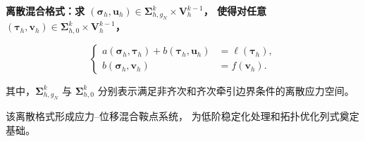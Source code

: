 \documentclass[notheorems]{beamer}
\begin{document}
\begin{frame}
{\begin{tcolorbox}
{					{\fontsize{7.6}{9.6}\selectfont\bfseries\sffamily
						离散混合格式：求
						$(\boldsymbol{\sigma}_h,\boldsymbol{u}_h)
						\in
						\boldsymbol{\Sigma}_{h,g_N}^{k}
						\times
						\boldsymbol{V}_h^{k-1}$，
						使得对任意
						$(\boldsymbol{\tau}_h,\boldsymbol{v}_h)
						\in
						\boldsymbol{\Sigma}_{h,0}^{k}
						\times
						\boldsymbol{V}_h^{k-1}$，}
					
					\vspace{-1.45em}
					
					\[
					\left\{
					\begin{aligned}
						a(\boldsymbol{\sigma}_h,\boldsymbol{\tau}_h)
						+
						b(\boldsymbol{\tau}_h,\boldsymbol{u}_h)
						&=
						\ell(\boldsymbol{\tau}_h),
						\\[4pt]
						b(\boldsymbol{\sigma}_h,\boldsymbol{v}_h)
						&=
						f(\boldsymbol{v}_h).
					\end{aligned}
					\right.
					\]
					
					{\fontsize{7.6}{9.6}\selectfont
						其中，$\boldsymbol{\Sigma}_{h,g_N}^{k}$ 与
						$\boldsymbol{\Sigma}_{h,0}^{k}$
						分别表示满足非齐次和齐次牵引边界条件的离散应力空间。}
				}
			\end{tcolorbox}
			
			\begin{tcolorbox}[
				colback=structure.fg, colframe=structure.fg,
				arc=3pt, boxrule=0pt,
				top=3pt, bottom=3pt, left=8pt, right=8pt]
				\centering
				{\fontsize{8.0}{11}\selectfont\sffamily\color{white}
					该离散格式形成应力--位移混合鞍点系统，
					为低阶稳定化处理和拓扑优化列式奠定基础。}
			\end{tcolorbox}
		}
		
	\end{frame}
	
	
\end{document}

